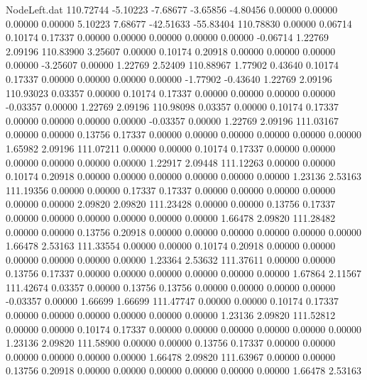 \begin{filecontents}{NodeLeft.dat}
 110.72744   -5.10223   -7.68677    -3.65856   -4.80456    0.00000    0.00000    0.00000    0.00000    5.10223    7.68677  -42.51633  -55.83404
 110.78830    0.00000    0.06714     0.10174    0.17337    0.00000    0.00000    0.00000    0.00000    0.00000   -0.06714    1.22769    2.09196
 110.83900    3.25607    0.00000     0.10174    0.20918    0.00000    0.00000    0.00000    0.00000   -3.25607    0.00000    1.22769    2.52409
 110.88967    1.77902    0.43640     0.10174    0.17337    0.00000    0.00000    0.00000    0.00000   -1.77902   -0.43640    1.22769    2.09196
 110.93023    0.03357    0.00000     0.10174    0.17337    0.00000    0.00000    0.00000    0.00000   -0.03357    0.00000    1.22769    2.09196
 110.98098    0.03357    0.00000     0.10174    0.17337    0.00000    0.00000    0.00000    0.00000   -0.03357    0.00000    1.22769    2.09196
 111.03167    0.00000    0.00000     0.13756    0.17337    0.00000    0.00000    0.00000    0.00000    0.00000    0.00000    1.65982    2.09196
 111.07211    0.00000    0.00000     0.10174    0.17337    0.00000    0.00000    0.00000    0.00000    0.00000    0.00000    1.22917    2.09448
 111.12263    0.00000    0.00000     0.10174    0.20918    0.00000    0.00000    0.00000    0.00000    0.00000    0.00000    1.23136    2.53163
 111.19356    0.00000    0.00000     0.17337    0.17337    0.00000    0.00000    0.00000    0.00000    0.00000    0.00000    2.09820    2.09820
 111.23428    0.00000    0.00000     0.13756    0.17337    0.00000    0.00000    0.00000    0.00000    0.00000    0.00000    1.66478    2.09820
 111.28482    0.00000    0.00000     0.13756    0.20918    0.00000    0.00000    0.00000    0.00000    0.00000    0.00000    1.66478    2.53163
 111.33554    0.00000    0.00000     0.10174    0.20918    0.00000    0.00000    0.00000    0.00000    0.00000    0.00000    1.23364    2.53632
 111.37611    0.00000    0.00000     0.13756    0.17337    0.00000    0.00000    0.00000    0.00000    0.00000    0.00000    1.67864    2.11567
 111.42674    0.03357    0.00000     0.13756    0.13756    0.00000    0.00000    0.00000    0.00000   -0.03357    0.00000    1.66699    1.66699
 111.47747    0.00000    0.00000     0.10174    0.17337    0.00000    0.00000    0.00000    0.00000    0.00000    0.00000    1.23136    2.09820
 111.52812    0.00000    0.00000     0.10174    0.17337    0.00000    0.00000    0.00000    0.00000    0.00000    0.00000    1.23136    2.09820
 111.58900    0.00000    0.00000     0.13756    0.17337    0.00000    0.00000    0.00000    0.00000    0.00000    0.00000    1.66478    2.09820
 111.63967    0.00000    0.00000     0.13756    0.20918    0.00000    0.00000    0.00000    0.00000    0.00000    0.00000    1.66478    2.53163

\end{filecontents}
